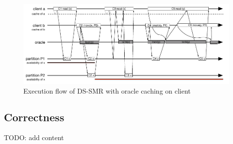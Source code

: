 

\begin{figure}
\begin{minipage}[b]{1\linewidth} %
\centering
      \includegraphics[width=0.85\linewidth]{figures/cache}
\end{minipage}
\caption{Execution flow of DS-SMR with oracle caching on client}
\label{fig:cache}
\end{figure}

\subsection{Correctness}
\label{sec:correctness}
TODO: add content